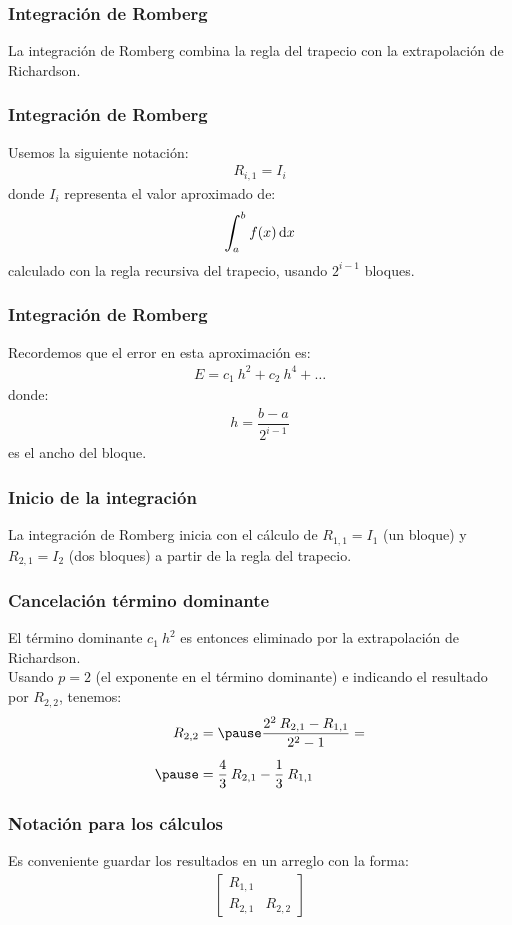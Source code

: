 \documentclass[12pt]{beamer}
\begin{document}
\begin{frame}
\frametitle{Integración de Romberg}
La integración de Romberg combina la \textcolor{lava}{regla del trapecio} con la \textcolor{ao}{extrapolación de Richardson}. 
\end{frame}
\begin{frame}
\frametitle{Integración de Romberg}
Usemos la siguiente notación:
\pause
\begin{align*}
R_{i, 1} = I_{i}
\end{align*}
donde $I_{i}$ representa el valor aproximado de:
\begin{align*}
\scaleint{6ex}_{\bs a}^{b} \: f (x) \dd{x}
\end{align*}
calculado con la regla recursiva del trapecio, usando $2^{i - 1}$ bloques.
\end{frame}
\begin{frame}
\frametitle{Integración de Romberg}
Recordemos que el error en esta aproximación es:
\pause
\begin{align*}
E = c_{1} \: h^{2} + c_{2} \: h^{4} + \ldots
\end{align*}
donde:
\begin{align*}
h = \dfrac{b - a}{2^{i - 1}}
\end{align*}
es el ancho del bloque.
\end{frame}
\begin{frame}
\frametitle{Inicio de la integración}
La integración de Romberg inicia con el cálculo de $R_{1, 1} = I_{1}$ (un bloque) y $R_{2, 1} = I_{2}$ (dos bloques) a partir de la regla del trapecio.
\end{frame}
\begin{frame}
\frametitle{Cancelación término dominante}
El término dominante $c_{1} \: h^{2}$ es entonces eliminado por la extrapolación de Richardson.
\\
\bigskip
\pause
Usando $p = 2$ (el exponente en el término dominante) e indicando el resultado por $R_{2, 2}$, tenemos:
\pause
\begin{eqnarray*}
\begin{aligned}
R_{2, 2} &= \pause \dfrac{2^{2} \: R_{2, 1} - R_{1, 1}}{2^{2} - 1} = \\[0.5em] \pause 
&= \dfrac{4}{3} \: R_{2, 1} - \dfrac{1}{3} \: R_{1, 1}
\end{aligned}
\end{eqnarray*}
\end{frame}
\begin{frame}
\frametitle{Notación para los cálculos}
Es conveniente guardar los resultados en un arreglo con la forma:
\pause
\begin{align*}
\begin{bmatrix}
R_{1, 1} & \\
R_{2, 1} & R_{2, 2}
\end{bmatrix}
\end{align*}
\end{frame}
\end{document}
